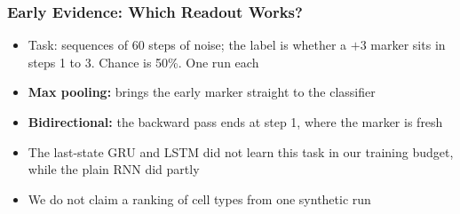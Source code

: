 \begin{frame}[fragile] \frametitle{Early Evidence: Which Readout Works?}
\begin{itemize}
\item Task: sequences of 60 steps of noise; the label is whether a $+3$ marker sits in steps 1 to 3. Chance is 50\%. One run each
\end{itemize}
\begin{center}
\small
{}
\end{center}
\begin{itemize}
\item \textbf{Max pooling:} brings the early marker straight to the classifier
\item \textbf{Bidirectional:} the backward pass ends at step 1, where the marker is fresh
\item The last-state GRU and LSTM did not learn this task in our training budget, while the plain RNN did partly
\item We do not claim a ranking of cell types from one synthetic run
\end{itemize}
\end{frame}


